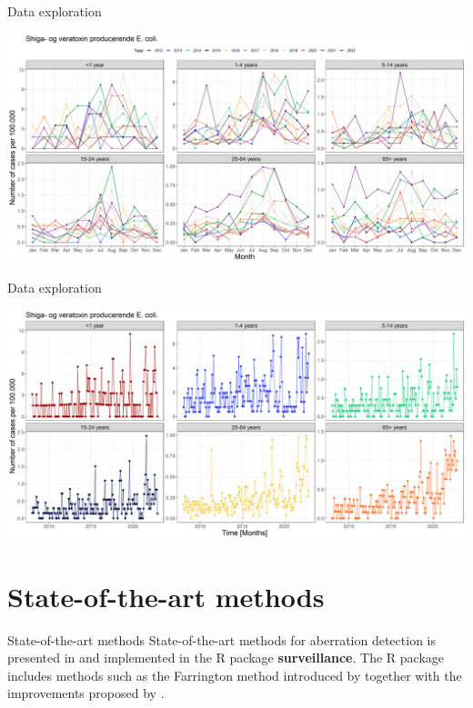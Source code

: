 \documentclass[aspectratio=169]{beamer}
\begin{document}
\begin{frame}{Data exploration}
\protect\hypertarget{data-exploration-2}{}
\tiny

\includegraphics[width=1\linewidth]{../figures/STECxEpixAgeGroup}

\normalsize
\end{frame}

\begin{frame}{Data exploration}
\protect\hypertarget{data-exploration-3}{}
\tiny

\includegraphics[width=1\linewidth]{../figures/ShigaogveratoxinproducerendeEcolixAgeGroup}

\normalsize
\end{frame}

\hypertarget{state-of-the-art-methods}{%
\section{State-of-the-art methods}\label{state-of-the-art-methods}}

\begin{frame}{State-of-the-art methods}
State-of-the-art methods for aberration detection is presented in
\cite{Salmon_2016} and implemented in the R package
\textbf{surveillance}. The R package includes methods such as the
Farrington method introduced by \cite{Farrington_1996} together with the
improvements proposed by \cite{Noufaily_2013}.
\end{frame}
\end{document}
